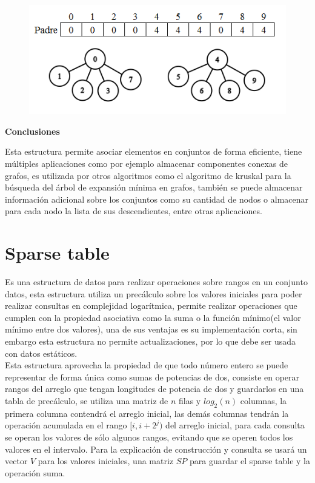 \documentclass[12pt, a4paper]{article}
\newcommand\cppfile[2][]{

}
\newcommand{\subtitulo}[1]{\begin{center}\textbf{#1}\end{center}}
\begin{document}
	\begin{figure}[!htb]
			\centering
			\includegraphics[scale=0.6]{Estructuras_de_datos/imagenes/disjoint_set/compresion}
			\caption{}
			\label{estructuras:disjoint_set:compresion}
		\endminipage
			\cppfile[16-21]{Estructuras_de_datos/codigos/union_find_compresion.cpp}
		\endminipage
	\end{figure}
	
	\subtitulo{Conclusiones}
	Esta estructura permite asociar elementos en conjuntos de forma eficiente, tiene múltiples aplicaciones como
	por ejemplo almacenar componentes conexas de grafos, es utilizada por otros algoritmos como el algoritmo de 
	kruskal para la búsqueda del árbol de expansión mínima en grafos, también se puede almacenar información
	adicional sobre los conjuntos como su cantidad de nodos o almacenar para cada nodo la lista de sus descendientes,
	entre otras aplicaciones.
	
	\section{Sparse table}
	\label{estructuras:sparse_table}
	
	Es una estructura de datos para realizar operaciones sobre rangos en un conjunto datos, esta 
	estructura utiliza un precálculo sobre los valores iniciales para poder realizar consultas en complejidad 
	logarítmica, permite realizar operaciones que cumplen con la propiedad asociativa como la suma o la función 
	mínimo(el valor mínimo entre dos valores), una de sus ventajas es su implementación corta, sin embargo esta 
	estructura no permite actualizaciones, por lo que debe ser usada con datos estáticos.\\
	
	Esta estructura aprovecha la propiedad de que todo número entero se puede representar de forma única como 
	sumas de potencias de dos, consiste en operar rangos del arreglo que tengan longitudes de potencia de dos y 
	guardarlos en una tabla de precálculo, se utiliza una matriz de $n$ filas y $log_{2}(n)$ columnas, la primera 
	columna contendrá el arreglo inicial, las demás columnas tendrán la operación acumulada en el rango 
	$[i, i+2^{j})$ del arreglo inicial, para cada consulta se operan los valores de sólo algunos rangos, evitando que 
	se operen todos los valores en el intervalo. Para la explicación de construcción y consulta se usará un vector 
	$V$ para los valores iniciales, una matriz $SP$ para guardar el sparse table y la operación suma.\\
	
\end{document}
